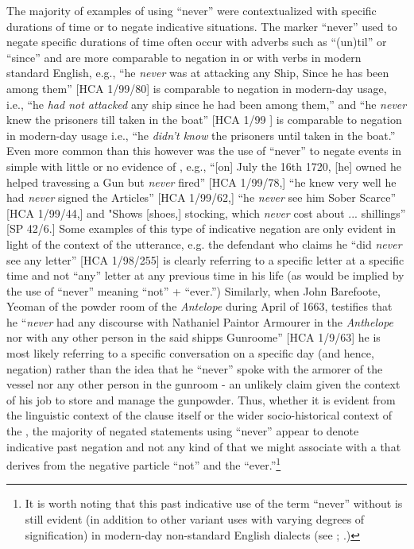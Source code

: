 The majority of examples of using “never” were contextualized with specific durations of time or to negate indicative  situations. The marker “never” used to negate specific durations of time often occur with adverbs such as “(un)til” or “since” and are more comparable to negation in  or with  verbs in modern standard English, e.g., “he \textit{never} was at attacking any Ship, Since he has been among them” [HCA 1/99/80] is comparable to  negation in modern-day usage, i.e., “he \textit{had not attacked} any ship since he had been among them,” and “he \textit{never} knew the prisoners till taken in the boat” [HCA 1/99  \citealt{Islands1722}] is comparable to  negation in modern-day usage i.e., “he \textit{didn't know} the prisoners until taken in the boat.” Even more common than this however was the use of “never” to negate events in simple  with little or no evidence of , e.g., “[on] July the 16th 1720, [he] owned he helped travessing a Gun but \textit{never} fired” [HCA 1/99/78,] “he knew very well he had \textit{never} signed the Articles” [HCA 1/99/62,] “he \textit{never} see him Sober Scarce” [HCA 1/99/44,] and "Shows [shoes,] stocking, which \textit{never} cost about ... shillings” [SP 42/6.] Some examples of this type of indicative  negation are only evident in light of the context of the utterance, e.g. the defendant who claims he “did \textit{never} see any letter” [HCA 1/98/255] is clearly referring to a specific letter at a specific time and not “any” letter at any previous time in his life (as would be implied by the use of “never” meaning “not” + “ever.”) Similarly, when John Barefoote, Yeoman of the powder room of the \textit{Antelope} during April of 1663, testifies that he “\textit{never} had any discourse with Nathaniel Paintor Armourer in the \textit{Anthelope} nor with any other person in the said shipps Gunroome” [HCA 1/9/63] he is most likely referring to a specific conversation on a specific day (and hence,  negation) rather than the idea that he “never” spoke with the armorer of the vessel nor any other person in the gunroom - an unlikely claim given the context of his job to store and manage the gunpowder. Thus, whether it is evident from the linguistic context of the clause itself or the wider socio-historical context of the , the majority of negated statements using “never” appear to denote indicative past negation and not any kind of  that we might associate with a  that derives from the negative particle “not” and the  “ever.”\footnote{It is worth noting that this past indicative use of the term “never” without  is still evident (in addition to other variant uses with varying degrees of  signification) in modern-day non-standard English dialects (see \citealt{LucasWills2012}; \citealt{Mazzen2004}.)}  

